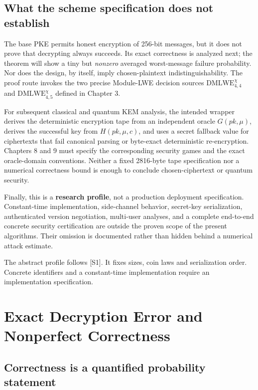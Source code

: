 \documentclass[
  11pt,
  a4paper,
  oneside]{report}
\begin{document}
\section{What the scheme specification does not
establish}\label{what-the-scheme-specification-does-not-establish}

The base PKE permits honest encryption of 256-bit messages, but it does
not prove that decrypting always succeeds. Its exact correctness is
analyzed next; the theorem will show a tiny but \emph{nonzero} averaged
worst-message failure probability. Nor does the design, by itself, imply
chosen-plaintext indistinguishability. The proof route invokes the two
precise Module-LWE decision sources \(\mathrm{DMLWE}_{4,4}^{\chi}\) and
\(\mathrm{DMLWE}_{4,5}^{\chi}\) defined in Chapter 3.

For subsequent classical and quantum KEM analysis, the intended wrapper
derives the deterministic encryption tape from an independent oracle
\(G(pk,\mu)\), derives the successful key from \(H(pk,\mu,c)\), and uses
a secret fallback value for ciphertexts that fail canonical parsing or
byte-exact deterministic re-encryption. Chapters 8 and 9 must specify
the corresponding security games and the exact oracle-domain
conventions. Neither a fixed 2816-byte tape specification nor a
numerical correctness bound is enough to conclude chosen-ciphertext or
quantum security.

Finally, this is a \textbf{research profile}, not a production
deployment specification. Constant-time implementation, side-channel
behavior, secret-key serialization, authenticated version negotiation,
multi-user analyses, and a complete end-to-end concrete security
certification are outside the proven scope of the present algorithms.
Their omission is documented rather than hidden behind a numerical
attack estimate.

The abstract profile follows {[}S1{]}. It fixes sizes, coin laws and
serialization order. Concrete identifiers and a constant-time
implementation require an implementation specification.

\chapter{Exact Decryption Error and Nonperfect
Correctness}\label{exact-decryption-error-and-nonperfect-correctness}

\section{Correctness is a quantified probability
statement}\label{correctness-is-a-quantified-probability-statement}
\end{document}
